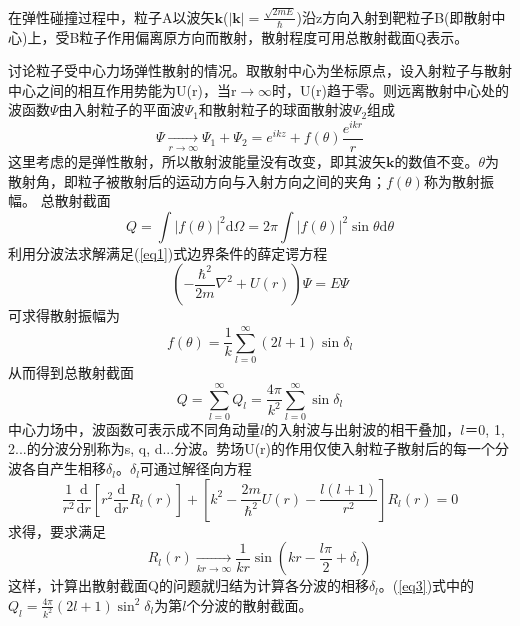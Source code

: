 \documentclass[a4paper]{article}
\begin{document}
在弹性碰撞过程中，粒子A以波矢$\mathbf{k}$($|\mathbf{k}| = \frac{\sqrt{2mE}}{\hbar}$)沿z方向入射到靶粒子B(即散射中心)上，受B粒子作用偏离原方向而散射，散射程度可用总散射截面Q表示。

讨论粒子受中心力场弹性散射的情况。取散射中心为坐标原点，设入射粒子与散射中心之间的相互作用势能为U(r)，当r$\to\infty$时，U(r)趋于零。则远离散射中心处的波函数$\Psi$由入射粒子的平面波$\Psi_1$和散射粒子的球面散射波$\Psi_2$组成
\begin{equation}
\Psi\xrightarrow[r\to\infty]{} \Psi_1+\Psi_2 = e^{ikz}+f(\theta)\frac{e^{ikr}}{r}\label{eq1}
\end{equation}
这里考虑的是弹性散射，所以散射波能量没有改变，即其波矢$\mathbf{k}$的数值不变。$\theta$为散射角，即粒子被散射后的运动方向与入射方向之间的夹角；$f(\theta)$称为散射振幅。
总散射截面
\begin{equation}
Q = \int|f(\theta)|^2\text{d}\Omega = 2\pi\int|f(\theta)|^2\sin\theta\text{d}\theta\label{eq2}
\end{equation}
利用分波法求解满足(\ref{eq1})式边界条件的薛定谔方程
\begin{equation*}
\left(-\frac{\hbar^2}{2m}\nabla^2+U(r)\right)\Psi = E\Psi
\end{equation*}
可求得散射振幅为
\begin{equation*}
f(\theta) = \frac{1}{k}\sum_{l=0}^{\infty}(2l+1)\sin\delta_l
\end{equation*}
从而得到总散射截面
\begin{equation}
Q = \sum_{l=0}^{\infty}Q_l = \frac{4\pi}{k^2}\sum_{l=0}^{\infty}\sin\delta_l\label{eq3}
\end{equation}
中心力场中，波函数可表示成不同角动量$l$的入射波与出射波的相干叠加，$l$＝0, 1, 2...的分波分别称为s, q, d...分波。势场U(r)的作用仅使入射粒子散射后的每一个分波各自产生相移$\delta_l$。$\delta_l$可通过解径向方程
\begin{equation}
\frac{1}{r^2}\frac{\text{d}}{\text{d}r}\left[r^2\frac{\text{d}}{\text{d}r}R_l(r)\right]+\left[k^2-\frac{2m}{\hbar^2}U(r)-\frac{l(l+1)}{r^2}\right]R_l(r) = 0\label{eq4}
\end{equation}
求得，要求满足
\begin{equation}
R_l(r)\xrightarrow[kr\to\infty]{}\frac{1}{kr}\sin(kr-\frac{l\pi}{2}+\delta_l)\label{eq5}
\end{equation}
这样，计算出散射截面Q的问题就归结为计算各分波的相移$\delta_l$。(\ref{eq3})式中的$Q_l= \frac{4\pi}{k^2}(2l+1)\sin^2\delta_l$为第$l$个分波的散射截面。
\end{document}
